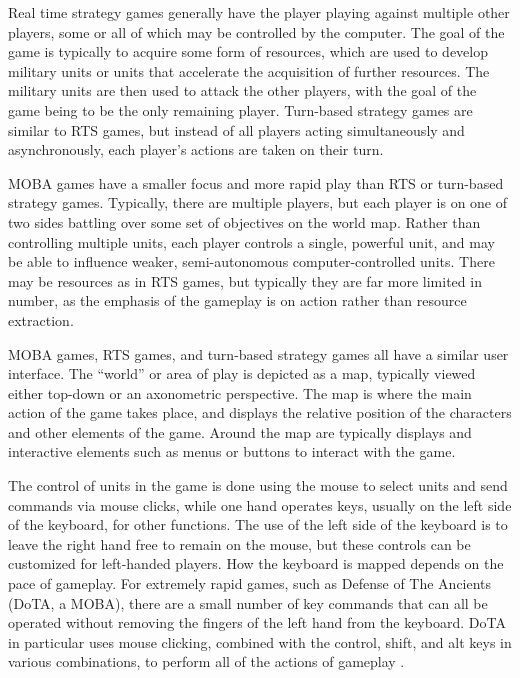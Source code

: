 Real time strategy games generally have the player playing against multiple other players, some or all of which may be controlled by the computer. 
The goal of the game is typically to acquire some form of resources, which are used to develop military units or units that accelerate the acquisition of further resources. 
The military units are then used to attack the other players, with the goal of the game being to be the only remaining player. 
Turn-based strategy games are similar to RTS games, but instead of all players acting simultaneously and asynchronously, each player's actions are taken on their turn. 

MOBA games have a smaller focus and more rapid play than RTS or turn-based strategy games. 
Typically, there are multiple players, but each player is on one of two sides battling over some set of objectives on the world map. 
Rather than controlling multiple units, each player controls a single, powerful unit, and may be able to influence weaker, semi-autonomous computer-controlled units.  There may be resources as in RTS games, but typically they are far more limited in number, as the emphasis of the gameplay is on action rather than resource extraction.   

MOBA games, RTS games, and turn-based strategy games all have a similar user interface. 
The ``world'' or area of play is depicted as a map, typically viewed either top-down or an axonometric perspective. 
The map is where the main action of the game takes place, and displays the relative position of the characters and other elements of the game. 
Around the map are typically displays and interactive elements such as menus or buttons to interact with the game. 

The control of units in the game is done using the mouse to select units and send commands via mouse clicks, while one hand operates keys, usually on the left side of the keyboard, for other functions. 
The use of the left side of the keyboard is to leave the right hand free to remain on the mouse, but these controls can be customized for left-handed players. 
How the keyboard is mapped depends on the pace of gameplay. 
For extremely rapid games, such as Defense of The Ancients (DoTA, a MOBA), there are a small number of key commands that can all be operated without removing the fingers of the left hand from the keyboard. 
DoTA in particular uses mouse clicking, combined with the control, shift, and alt keys in various combinations, to perform all of the actions of gameplay \citep{DOTAControls}.

